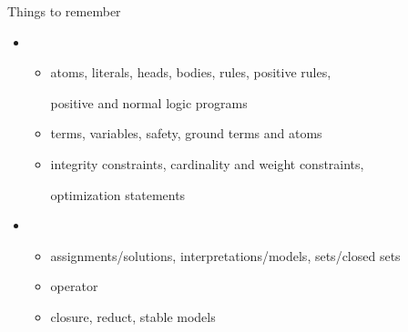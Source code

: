 \begin{frame}{Things to remember}
  \medskip
  \begin{itemize}
  \item {}
    \begin{itemize}\normalsize
    \item atoms, literals, heads, bodies, rules, positive rules,

      positive and normal \alert{logic programs}
      \smallskip
    \item terms, variables, safety, ground terms and atoms
      \smallskip
    \item integrity constraints, cardinality and weight constraints,

      optimization statements
    \end{itemize}
  \bigskip
  \item {}
    \begin{itemize}\normalsize
    \item assignments/solutions, interpretations/models, sets/closed sets
      \smallskip
    \item {} operator
      \smallskip
    \item closure, reduct, \alert{stable models}
    \end{itemize}
  \end{itemize}
\end{frame}
%
